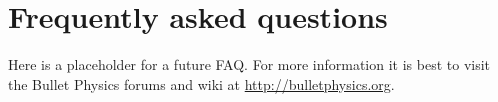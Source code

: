 
\chapter{Frequently asked questions}
Here is a placeholder for a future FAQ. For more information it is best to visit the Bullet Physics forums and wiki at \url{http://bulletphysics.org}.
